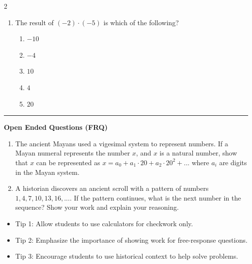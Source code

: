 \documentclass[10pt]{article}
\begin{document}
\begin{multicols}{2}
\begin{enumerate}[label=\textbf{Q\arabic*.}, leftmargin=*, itemsep=6pt, parsep=0pt]
  \item \small The result of $(-2) \cdot (-5)$ is which of the following?
  \begin{enumerate}[label=(\Alph*), leftmargin=0.6cm, nosep, itemsep=2pt]
    \item $-10$
    \item $-4$
    \item $10$
    \item $4$
    \item $20$
  \end{enumerate}

\end{enumerate}
\end{multicols}

\vspace{-0.2cm}
\hrule
\vspace{0.2cm}
\textbf{\small Open Ended Questions (FRQ)}
\begin{enumerate}[label=\textbf{Q\arabic*.}, start=9, itemsep=5pt, topsep=0pt]

  \item \small The ancient Mayans used a vigesimal system to represent numbers. If a Mayan numeral represents the number $x$, and $x$ is a natural number, show that $x$ can be represented as $x = a_0 + a_1 \cdot 20 + a_2 \cdot 20^2 + ...$ where $a_i$ are digits in the Mayan system. \vspace{2cm}

  \item \small A historian discovers an ancient scroll with a pattern of numbers $1, 4, 7, 10, 13, 16, ...$. If the pattern continues, what is the next number in the sequence? Show your work and explain your reasoning. \vspace{2cm}

\end{enumerate}

\vfill

\begin{tcolorbox}[colback=blue!5, colframe=mainblue!50, title=\small \textbf{Chef's Tips}, fonttitle=\bfseries, bottom=1mm]
\begin{itemize}[noitemsep, topsep=2pt, leftmargin=0.5cm]
  \item \scriptsize Tip 1: Allow students to use calculators for checkwork only.\item \scriptsize Tip 2: Emphasize the importance of showing work for free-response questions.\item \scriptsize Tip 3: Encourage students to use historical context to help solve problems.
\end{itemize}
\end{tcolorbox}
\end{document}
